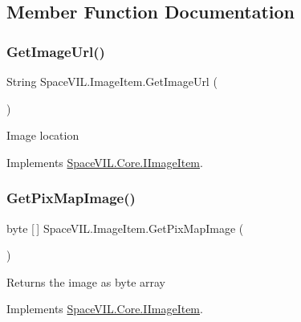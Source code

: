 \subsection{Member Function Documentation}
\mbox{\label{class_space_v_i_l_1_1_image_item_a9da0616d71482cc74d16e83ea00913af}} 
\subsubsection{\texorpdfstring{Get\+Image\+Url()}{GetImageUrl()}}
{\footnotesize\ttfamily String Space\+V\+I\+L.\+Image\+Item.\+Get\+Image\+Url (\begin{DoxyParamCaption}{ }\end{DoxyParamCaption})\hspace{0.3cm}{\ttfamily [inline]}}



Image location 



Implements \mbox{\hyperlink{interface_space_v_i_l_1_1_core_1_1_i_image_item}{Space\+V\+I\+L.\+Core.\+I\+Image\+Item}}.

\mbox{\label{class_space_v_i_l_1_1_image_item_a85be98b3558beec30a134e2da5304fd5}} 
\subsubsection{\texorpdfstring{Get\+Pix\+Map\+Image()}{GetPixMapImage()}}
{\footnotesize\ttfamily byte \mbox{[}$\,$\mbox{]} Space\+V\+I\+L.\+Image\+Item.\+Get\+Pix\+Map\+Image (\begin{DoxyParamCaption}{ }\end{DoxyParamCaption})\hspace{0.3cm}{\ttfamily [inline]}}



Returns the image as byte array 



Implements \mbox{\hyperlink{interface_space_v_i_l_1_1_core_1_1_i_image_item}{Space\+V\+I\+L.\+Core.\+I\+Image\+Item}}.

